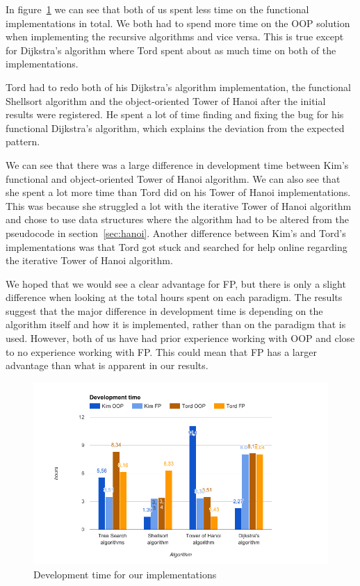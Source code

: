\documentclass {article}
\begin{document}
In figure~\ref{fig:development-time-graph} we can see that both of us spent less time on the functional implementations in total. We both had to spend more time on the OOP solution when implementing the recursive algorithms and vice versa. This is true except for Dijkstra's algorithm where Tord spent about as much time on both of the implementations. 

Tord had to redo both of his Dijkstra's algorithm implementation, the functional Shellsort algorithm and the object-oriented Tower of Hanoi after the initial results were registered. He spent a lot of time finding and fixing the bug for his functional Dijkstra's algorithm, which explains the deviation from the expected pattern.

We can see that there was a large difference in development time between Kim's functional and object-oriented Tower of Hanoi algorithm. We can also see that she spent a lot more time than Tord did on his Tower of Hanoi implementations. This was because she struggled a lot with the iterative Tower of Hanoi algorithm and chose to use data structures where the algorithm had to be altered from the pseudocode in section~\ref{sec:hanoi}. Another difference between Kim's and Tord's implementations was that Tord got stuck and searched for help online regarding the iterative Tower of Hanoi algorithm.

We hoped that we would see a clear advantage for FP, but there is only a slight difference when looking at the total hours spent on each paradigm. The results suggest that the major difference in development time is depending on the algorithm itself and how it is implemented, rather than on the paradigm that is used. However, both of us have had prior experience working with OOP and close to no experience working with FP. This could mean that FP has a larger advantage than what is apparent in our results. 

\begin{figure}[H]
\centering
\includegraphics[width=\textwidth]{development-time-graph}

\caption{Development time for our implementations}
\label{fig:development-time-graph}
\end{figure}
\end{document}
